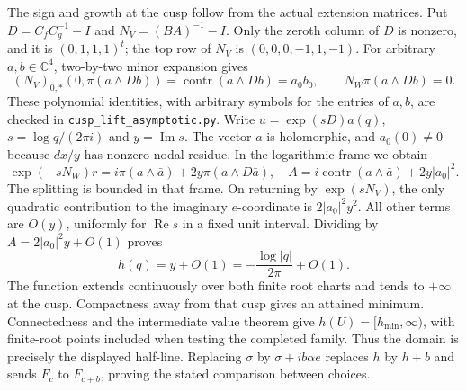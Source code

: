 \item The sign and growth at the cusp follow from the actual extension
matrices.  Put $D=C_fC_g^{-1}-I$ and $N_V=(BA)^{-1}-I$.
Only the zeroth column of $D$ is nonzero, and it is $(0,1,1,1)^t$;
the top row of $N_V$ is $(0,0,0,-1,1,-1)$.
For arbitrary $a,b\in\mathbb C^4$, two-by-two minor expansion gives
\[
(N_V)_{0,*}(0,\pi(a\wedge Db))
 =\operatorname{contr}(a\wedge Db)=a_0b_0,
 \qquad N_W\pi(a\wedge Db)=0.
\]
These polynomial identities, with arbitrary symbols for the entries of
$a,b$, are checked in \texttt{cusp\_lift\_asymptotic.py}.
Write $u=\exp(sD)a(q)$, $s=\log q/(2\pi i)$ and $y=\operatorname{Im}s$.
The vector $a$ is holomorphic, and $a_0(0)\ne0$ because $dx/y$ has
nonzero nodal residue.  In the logarithmic frame we obtain
\[
\exp(-sN_W)r=i\pi(a\wedge\bar a)+2y\pi(a\wedge D\bar a),
\quad
A=i\operatorname{contr}(a\wedge\bar a)+2y|a_0|^2.
\]
The splitting is bounded in that frame.  On returning by
$\exp(sN_V)$, the only quadratic contribution to the imaginary
$e$-coordinate is $2|a_0|^2y^2$.  All other terms are $O(y)$,
uniformly for $\operatorname{Re}s$ in a fixed unit interval.
Dividing by $A=2|a_0|^2y+O(1)$ proves
\[
h(q)=y+O(1)=-\frac{\log|q|}{2\pi}+O(1).
\]
The function extends continuously over both finite root charts and
tends to $+\infty$ at the cusp.  Compactness away from that cusp gives
an attained minimum.  Connectedness and the intermediate value
theorem give $h(U)=[h_{\min},\infty)$, with finite-root points included
when testing the completed family.  Thus the domain is precisely the
displayed half-line.  Replacing $\sigma$ by $\sigma+ib\alpha e$ replaces
$h$ by $h+b$ and sends $F_c$ to $F_{c+b}$, proving the stated
comparison between choices.

